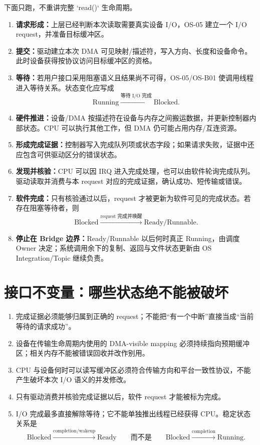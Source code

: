 \documentclass[UTF8,fontset=none,11pt,a4paper]{ctexart}
\begin{document}
下面只跑，不重讲完整 `read()` 生命周期。

\begin{enumerate}
  \item \textbf{请求形成：}上层已经判断本次读取需要真实设备 I/O，OS-05 建立一个 I/O request，并准备目标缓冲区。
  \item \textbf{提交：}驱动建立本次 DMA 可见映射/描述符，写入方向、长度和设备命令。此时设备获得按协议访问目标缓冲区的资格。
  \item \textbf{等待：}若用户接口采用阻塞语义且结果尚不可得，OS-05/OS-B01 使调用线程进入等待关系。状态变化应写成
  \[
  \text{Running}\xrightarrow{\text{等待 I/O 完成}}\text{Blocked}.
  \]
  \item \textbf{硬件推进：}设备/DMA 按描述符在设备与内存之间搬运数据，并更新控制器内部状态。CPU 可以执行其他工作，但 DMA 仍可能占用内存/互连资源。
  \item \textbf{形成完成证据：}控制器写入完成队列项或状态字段；如果请求失败，证据中还应包含可供驱动区分的错误状态。
  \item \textbf{发现并核验：}CPU 可以因 IRQ 进入完成处理，也可以由软件轮询完成队列。驱动读取并消费与本 request 对应的完成证据，确认成功、短传输或错误。
  \item \textbf{软件完成：}只有核验通过以后，request 才被更新为软件可见的完成状态。若存在阻塞等待者，则
  \[
  \text{Blocked}\xrightarrow{\text{request 完成并唤醒}}\text{Ready/Runnable}.
  \]
  \item \textbf{停止在 Bridge 边界：}Ready/Runnable 以后何时真正 Running，由调度 Owner 决定；系统调用余下的复制、返回与文件状态更新由 OS Integration/Topic 继续负责。
\end{enumerate}

\section{接口不变量：哪些状态绝不能被破坏}

\begin{enumerate}
  \item {}完成证据必须能够归属到正确的 request；不能把“有一个中断”直接当成“当前等待的请求成功”。
  \item {}设备在传输生命周期内使用的 DMA-visible mapping 必须持续指向预期缓冲区；相关内存不能被错误回收并改作别用。
  \item {}CPU 与设备何时可以读写缓冲区必须符合传输方向和平台一致性协议，不能产生破坏本次 I/O 语义的并发修改。
  \item {}只有驱动消费并核验完成证据以后，软件 request 才能被标为完成。
  \item {}I/O 完成最多直接解除等待；它不能单独推出线程已经获得 CPU。稳定状态关系是
  \[
  \text{Blocked}\xrightarrow{\text{completion/wakeup}}\text{Ready}
  \qquad\text{而不是}\qquad
  \text{Blocked}\xrightarrow{\text{completion}}\text{Running}.
  \]
\end{enumerate}
\end{document}
